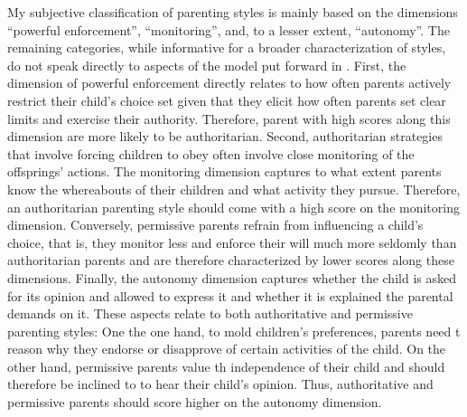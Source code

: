 My subjective classification of parenting styles is mainly based on the dimensions ``powerful enforcement'', ``monitoring'', and, to a lesser extent, ``autonomy''. The remaining categories, while informative for a broader characterization of styles, do not speak directly to aspects of the model put forward in \textcite{doepkeParentingStyleAltruism2017}. First, the dimension of powerful enforcement directly relates to how often parents actively restrict their child's choice set given that they elicit how often parents set clear limits and exercise their authority. Therefore, parent with high scores along this dimension are more likely to be authoritarian. Second, authoritarian strategies that involve forcing children to obey often involve close monitoring of the offsprings' actions. The monitoring dimension captures to what extent parents know the whereabouts of their children and what activity they pursue. Therefore, an authoritarian parenting style should come with a high score on the monitoring dimension. Conversely, permissive parents refrain from influencing a child's choice, that is, they monitor less and enforce their will much more seldomly than authoritarian parents and are therefore characterized by lower scores along these dimensions. Finally, the autonomy dimension captures whether the child is asked for its opinion and allowed to express it and whether it is explained the parental demands on it. These aspects relate to both authoritative and permissive parenting styles: One the one hand, to mold children's preferences, parents need t reason why they endorse or disapprove of certain activities of the child. On the other hand, permissive parents value th independence of their child and should therefore be inclined to to hear their child's opinion. Thus, authoritative and permissive parents should score higher on the autonomy dimension.
%
